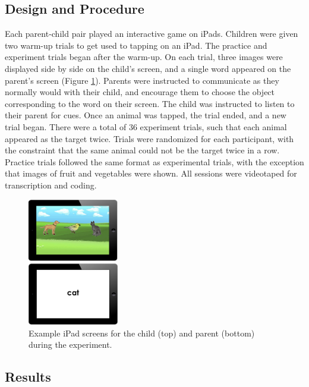 \documentclass[10pt, letterpaper]{article}
\newenvironment{CodeChunk}{}{}
\begin{document}
\hypertarget{design-and-procedure}{%
\subsection{Design and Procedure}\label{design-and-procedure}}

Each parent-child pair played an interactive game on iPads. Children
were given two warm-up trials to get used to tapping on an iPad. The
practice and experiment trials began after the warm-up. On each trial,
three images were displayed side by side on the child's screen, and a
single word appeared on the parent's screen (Figure \ref{fig:ipads}).
Parents were instructed to communicate as they normally would with their
child, and encourage them to choose the object corresponding to the word
on their screen. The child was instructed to listen to their parent for
cues. Once an animal was tapped, the trial ended, and a new trial began.
There were a total of 36 experiment trials, such that each animal
appeared as the target twice. Trials were randomized for each
participant, with the constraint that the same animal could not be the
target twice in a row. Practice trials followed the same format as
experimental trials, with the exception that images of fruit and
vegetables were shown. All sessions were videotaped for transcription
and coding.

\begin{CodeChunk}
\begin{figure}[tb]

{\centering \includegraphics[width=150px]{figs/ipads} 

}

\caption[Example iPad screens for the child (top) and parent (bottom) during the experiment]{Example iPad screens for the child (top) and parent (bottom) during the experiment.}\label{fig:ipads}
\end{figure}
\end{CodeChunk}

\hypertarget{results}{%
\subsection{Results}\label{results}}
\end{document}
